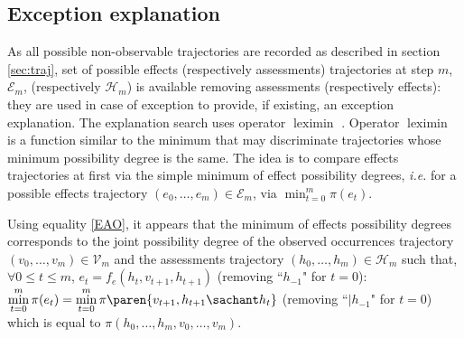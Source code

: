 \subsection{Exception explanation}
As all possible non-observable trajectories are recorded 
as described in section \ref{sec:traj}, 
set of possible effects (respectively assessments) 
trajectories at step $m$, 
$\mathcal{E}_m$, (respectively $\mathcal{H}_m$) 
is available removing assessments (respectively effects): 
they are used in case of exception to provide, 
if existing, an exception explanation. 
The explanation search uses operator $\operatorname*{leximin}$ \cite{Dubois05b}. 
Operator $\operatorname*{leximin}$ is a function similar to the minimum 
that may discriminate trajectories 
whose minimum possibility degree is the same. 
The idea is to compare effects trajectories 
at first via the simple minimum of effect possibility degrees, 
\textit{i.e.} for a possible effects trajectory 
$(e_0,\ldots,e_m) \in \mathcal{E}_m$, 
via $\displaystyle \min_{t=0}^m \pi(e_t)$. 

Using equality \ref{EAO}, it appears that
the minimum of effects possibility degrees
corresponds to the joint possibility degree 
of the observed occurrences trajectory $(v_0, \ldots,v_m ) \in \mathcal{V}_m$
and the assessments trajectory 
$(h_0,\ldots,h_m) \in \mathcal{H}_m$ 
such that, $\forall 0 \leqslant t \leqslant m$, $e_t = f_e(h_t,v_{t+1},h_{t+1})$ 
(removing ``$h_{-1}$" for $t=0$):
$\displaystyle \min_{t=0}^m \pi(e_t) = \displaystyle \min_{t=0}^{m} \pi \paren{ v_{t+1},h_{t+1} \sachant h_t }$
(removing ``$|h_{-1}$" for $t=0$) which is equal to $\pi( h_0, \ldots, h_m, v_0, \ldots,v_m )$. 

